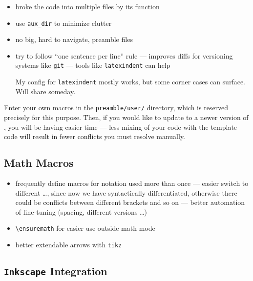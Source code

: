 \begin{itemize}
    \item broke the code into multiple files by its function
    \item use \verb|aux_dir| to minimize clutter
    \item no big, hard to navigate, preamble files
    \item try to follow \enquote{one sentence per line} rule --- improves diffs for versioning systems like \texttt{git} --- tools like \texttt{latexindent} can help
          \begin{Note}
              My config for \texttt{latexindent} mostly works, but some corner cases can surface.
              Will share someday.
          \end{Note}
\end{itemize}

\begin{Suggestion}
    Enter your own macros in the \texttt{preamble/user/} directory, which is reserved precisely for this purpose. Then, if you would like to update to a newer version of \TeXtured{}, you will be having easier time --- less mixing of your code with the template code will result in fewer conflicts you must resolve manually.
\end{Suggestion}


\subsection{Math Macros}%
\label{sub Macros}

\begin{itemize}
    \item frequently define macros for notation used more than once
          --- easier switch to different \ldots, since now we have syntactically differentiated,
          otherwise there could be conflicts between different brackets and so on
          --- better automation of fine-tuning (spacing, different versions \ldots)
    \item \verb|\ensuremath| for easier use outside math mode
    \item better extendable arrows with \texttt{tikz}
\end{itemize}


\subsection{\texorpdfstring{\texttt{Inkscape}}{Inkscape} Integration}%
\label{sub:Inkscape Integration}

